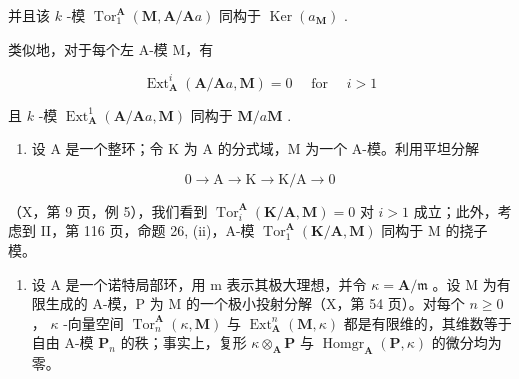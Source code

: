 并且该 \(k\) -模 \(\operatorname{Tor}_1^{\mathbf{A}}(\mathbf{M}, \mathbf{A} / \mathbf{A}a)\) 同构于 \(\operatorname{Ker}(a_{\mathbf{M}})\) .

类似地，对于每个左 A-模 M，有

\[
\operatorname{Ext} _ {\mathbf {A}} ^ {i} (\mathbf {A} / \mathbf {A} a, \mathbf {M}) = 0 \quad \text { for } \quad i > 1
\]

且 \(k\) -模 \(\operatorname{Ext}_{\mathbf{A}}^{1}(\mathbf{A}/\mathbf{A}a, \mathbf{M})\) 同构于 \(\mathbf{M}/a\mathbf{M}\) .

\begin{enumerate}
\def\labelenumi{\arabic{enumi})}
\setcounter{enumi}{1}
\tightlist
\item
  设 A 是一个整环；令 K 为 A 的分式域，M 为一个 A-模。利用平坦分解
\end{enumerate}

\[
0 \rightarrow \mathrm{A} \rightarrow \mathrm{K} \rightarrow \mathrm{K} / \mathrm{A} \rightarrow 0
\]

（X，第 9 页，例 5），我们看到 \(\operatorname{Tor}_{i}^{\mathbf{A}}(\mathbf{K}/\mathbf{A}, \mathbf{M}) = 0\) 对 \(i > 1\) 成立；此外，考虑到 II，第 116 页，命题 26, (ii)，A-模 \(\operatorname{Tor}_{1}^{\mathbf{A}}(\mathbf{K}/\mathbf{A}, \mathbf{M})\) 同构于 M 的挠子模。

\begin{enumerate}
\def\labelenumi{\arabic{enumi})}
\setcounter{enumi}{2}
\tightlist
\item
  设 A 是一个诺特局部环，用 m 表示其极大理想，并令 \(\kappa = \mathbf{A} / \mathfrak{m}\) 。设 M 为有限生成的 A-模，P 为 M 的一个极小投射分解（X，第 54 页）。对每个 \(n \geqslant 0\) ， \(\kappa\) -向量空间 \(\operatorname{Tor}_n^{\mathbf{A}}(\kappa, \mathbf{M})\) 与 \(\operatorname{Ext}_{\mathbf{A}}^{n}(\mathbf{M}, \kappa)\) 都是有限维的，其维数等于自由 A-模 \(\mathbf{P}_n\) 的秩；事实上，复形 \(\kappa \otimes_{\mathbf{A}} \mathbf{P}\) 与 \(\operatorname{Homgr}_{\mathbf{A}}(\mathbf{P}, \kappa)\) 的微分均为零。
\end{enumerate}

